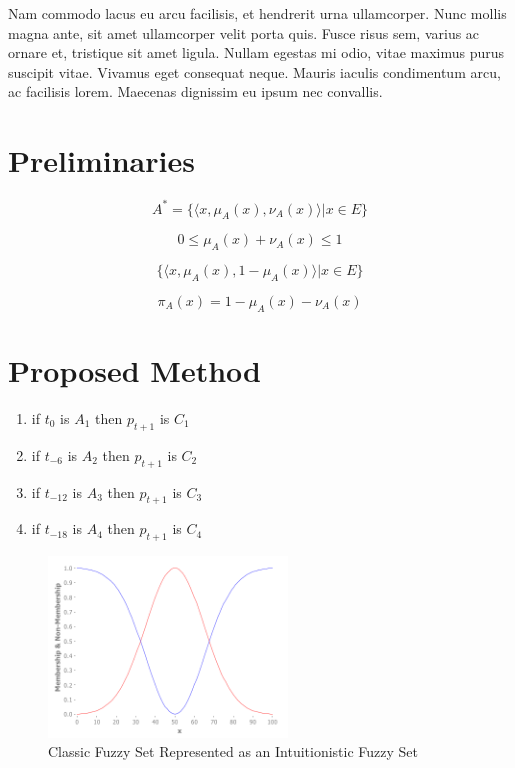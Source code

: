 \documentclass[conference]{IEEEtran}
\begin{document}
Nam commodo lacus eu arcu facilisis, et hendrerit urna ullamcorper. Nunc mollis magna ante, sit amet ullamcorper velit porta quis. Fusce risus sem, varius ac ornare et, tristique sit amet ligula. Nullam egestas mi odio, vitae maximus purus suscipit vitae. Vivamus eget consequat neque. Mauris iaculis condimentum arcu, ac facilisis lorem. Maecenas dignissim eu ipsum nec convallis.

\section{Preliminaries}

\begin{equation}
  A^{*} = \{\langle x, \mu _{A} (x), \nu _{A} (x) \rangle | x \in E\}
\end{equation}

\begin{equation}
  0 \leq \mu_{A}(x) + \nu_{A}(x) \leq 1
\end{equation}

\begin{equation}
  \{ \langle x, \mu_{A}(x), 1 - \mu_{A}(x) \rangle | x \in E \}
\end{equation}

\begin{equation}
  \pi_{A}(x) = 1 - \mu_{A}(x) - \nu_{A}(x)
\end{equation}

\section{Proposed Method}

\begin{enumerate}
  \item if $t_{0}$ is $A_{1}$ then $p_{t+1}$ is $C_{1}$
  \item if $t_{-6}$ is $A_{2}$ then $p_{t+1}$ is $C_{2}$
  \item if $t_{-12}$ is $A_{3}$ then $p_{t+1}$ is $C_{3}$
  \item if $t_{-18}$ is $A_{4}$ then $p_{t+1}$ is $C_{4}$
\end{enumerate}

\begin{figure}[!t]
  \centering
  \includegraphics[width=2.5in]{fs-as-ifs}
  \caption{Classic Fuzzy Set Represented as an Intuitionistic Fuzzy Set}
  \label{fs-as-ifs}
\end{figure}
\end{document}
